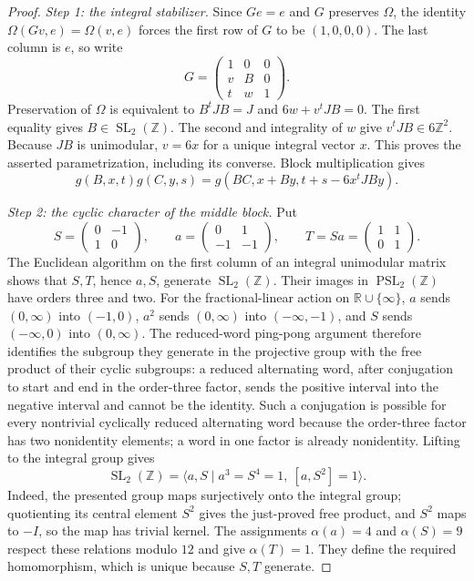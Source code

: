 \begin{proof}
\textit{Step 1: the integral stabilizer.}
Since $Ge=e$ and $G$ preserves $\Omega$, the identity
$\Omega(Gv,e)=\Omega(v,e)$ forces the first row of $G$ to be
$(1,0,0,0)$. The last column is $e$, so write
\[
 G=\begin{pmatrix}1&0&0\\v&B&0\\t&w&1\end{pmatrix}.
\]
Preservation of $\Omega$ is equivalent to
$B^tJB=J$ and $6w+v^tJB=0$. The first equality gives
$B\in\operatorname{SL}_2(\mathbb Z)$. The second and integrality of $w$
give $v^tJB\in6\mathbb Z^2$. Because $JB$ is unimodular,
$v=6x$ for a unique integral vector $x$. This proves the asserted
parametrization, including its converse. Block multiplication gives
\begin{equation}\label{eq:cdp-parabolic-law}
 g(B,x,t)g(C,y,s)=g(BC,x+By,t+s-6x^tJBy).
\end{equation}

\textit{Step 2: the cyclic character of the middle block.}
Put
\[
 S=\begin{pmatrix}0&-1\\1&0\end{pmatrix},\qquad
 a=\begin{pmatrix}0&1\\-1&-1\end{pmatrix},\qquad
 T=Sa=\begin{pmatrix}1&1\\0&1\end{pmatrix}.
\]
The Euclidean algorithm on the first column of an integral
unimodular matrix shows that $S,T$, hence $a,S$, generate
$\operatorname{SL}_2(\mathbb Z)$. Their images in
$\operatorname{PSL}_2(\mathbb Z)$ have orders three and two.
For the fractional-linear action on $\mathbb R\cup\{\infty\}$,
$a$ sends $(0,\infty)$ into $(-1,0)$, $a^2$ sends
$(0,\infty)$ into $(-\infty,-1)$, and $S$ sends
$(-\infty,0)$ into $(0,\infty)$. The reduced-word ping-pong argument
therefore identifies the subgroup they generate in the projective
group with the free product of their cyclic subgroups: a reduced
alternating word, after conjugation to start and end in the
order-three factor, sends the positive interval into the negative
interval and cannot be the identity. Such a conjugation is possible
for every nontrivial cyclically reduced alternating word because
the order-three factor has two nonidentity elements; a word in one
factor is already nonidentity. Lifting to the integral group gives
\[
 \operatorname{SL}_2(\mathbb Z)
 =\langle a,S\mid a^3=S^4=1,\ [a,S^2]=1\rangle.
\]
Indeed, the presented group maps surjectively onto the integral
group; quotienting its central element $S^2$ gives the just-proved
free product, and $S^2$ maps to $-I$, so the map has trivial kernel.
The assignments $\alpha(a)=4$ and $\alpha(S)=9$ respect these
relations modulo $12$ and give $\alpha(T)=1$. They define the
required homomorphism, which is unique because $S,T$ generate.


\end{proof}
